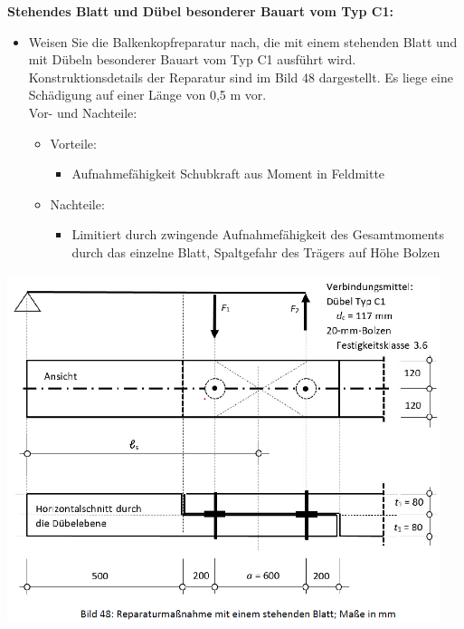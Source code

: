 \documentclass[fleqn,twoside]{article}
\begin{document}
        \textbf{Stehendes Blatt und Dübel besonderer Bauart vom Typ C1:}\\
        \begin{minipage}{0.55\textwidth}
        
        \begin{itemize}
            \item Weisen Sie die Balkenkopfreparatur nach, die mit einem stehenden Blatt und mit Dübeln besonderer
                Bauart vom Typ C1 ausführt wird. Konstruktionsdetails der Reparatur sind im Bild 48 dargestellt. Es liege eine Schädigung auf einer Länge von 0,5 m vor.\\
                Vor- und Nachteile:
            \begin{itemize}
                \item Vorteile:
                    \begin{itemize}
                        \item Aufnahmefähigkeit Schubkraft aus Moment in Feldmitte
                    \end{itemize}
                \item Nachteile:
                    \begin{itemize}
                        \item Limitiert durch zwingende Aufnahmefähigkeit des Gesamtmoments durch das einzelne Blatt, Spaltgefahr des Trägers auf Höhe Bolzen
                    \end{itemize}
            \end{itemize}
        \end{itemize}

        \end{minipage}    
        \begin{minipage}{0.45\textwidth}
            \includegraphics[width=0.95\textwidth]{Grafiken/Denkmalpflegerische Arbeit/Balkenkopfreparatur 4.png}
        \end{minipage}
\end{document}
